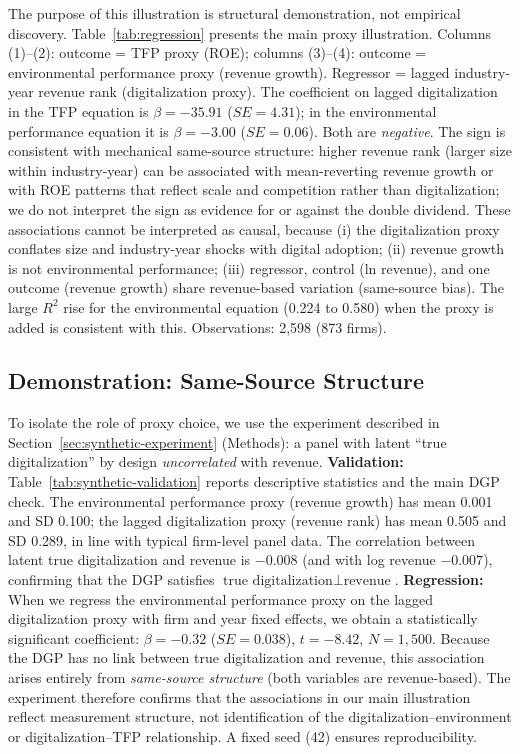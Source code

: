 The purpose of this illustration is structural demonstration, not empirical discovery. Table~\ref{tab:regression} presents the main proxy illustration. Columns (1)--(2): outcome = TFP proxy (ROE); columns (3)--(4): outcome = environmental performance proxy (revenue growth). Regressor = lagged industry-year revenue rank (digitalization proxy). The coefficient on lagged digitalization in the TFP equation is $\beta = -35.91$ ($SE = 4.31$); in the environmental performance equation it is $\beta = -3.00$ ($SE = 0.06$). Both are \emph{negative}. The sign is consistent with mechanical same-source structure: higher revenue rank (larger size within industry-year) can be associated with mean-reverting revenue growth or with ROE patterns that reflect scale and competition rather than digitalization; we do not interpret the sign as evidence for or against the double dividend. These associations cannot be interpreted as causal, because (i) the digitalization proxy conflates size and industry-year shocks with digital adoption; (ii) revenue growth is not environmental performance; (iii) regressor, control (ln revenue), and one outcome (revenue growth) share revenue-based variation (same-source bias). The large $R^2$ rise for the environmental equation (0.224 to 0.580) when the proxy is added is consistent with this. Observations: 2,598 (873 firms).

\subsection{Demonstration: Same-Source Structure}

To isolate the role of proxy choice, we use the experiment described in Section~\ref{sec:synthetic-experiment} (Methods): a panel with latent ``true digitalization'' by design \emph{uncorrelated} with revenue. \textbf{Validation:} Table~\ref{tab:synthetic-validation} reports descriptive statistics and the main DGP check. The environmental performance proxy (revenue growth) has mean 0.001 and SD 0.100; the lagged digitalization proxy (revenue rank) has mean 0.505 and SD 0.289, in line with typical firm-level panel data. The correlation between latent true digitalization and revenue is $-0.008$ (and with log revenue $-0.007$), confirming that the DGP satisfies $\text{true digitalization} \perp \text{revenue}$. \textbf{Regression:} When we regress the environmental performance proxy on the lagged digitalization proxy with firm and year fixed effects, we obtain a statistically significant coefficient: $\beta = -0.32$ ($SE = 0.038$), $t = -8.42$, $N = 1{,}500$. Because the DGP has no link between true digitalization and revenue, this association arises entirely from \emph{same-source structure} (both variables are revenue-based). The experiment therefore confirms that the associations in our main illustration reflect measurement structure, not identification of the digitalization--environment or digitalization--TFP relationship. A fixed seed (42) ensures reproducibility.

